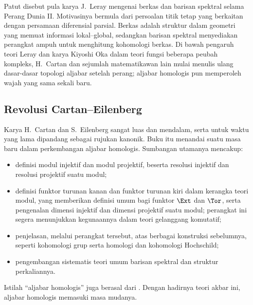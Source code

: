 Patut disebut pula karya J.\ Leray mengenai berkas dan barisan spektral
selama Perang Dunia II. Motivasinya bermula dari persoalan titik tetap
yang berkaitan dengan persamaan diferensial parsial. Berkas adalah
struktur dalam geometri yang memuat informasi lokal--global, sedangkan
barisan spektral menyediakan perangkat ampuh untuk menghitung kohomologi
berkas. Di bawah pengaruh teori Leray dan karya Kiyoshi Oka dalam teori
fungsi beberapa peubah kompleks, H.\ Cartan dan sejumlah matematikawan lain
mulai menulis ulang dasar-dasar topologi aljabar setelah perang; aljabar
homologis pun memperoleh wajah yang sama sekali baru.

\subsection*{Revolusi Cartan--Eilenberg}

Karya H.\ Cartan dan S.\ Eilenberg \cite{CE56} sangat luas dan mendalam,
serta untuk waktu yang lama dipandang sebagai rujukan kanonik. Buku itu
menandai suatu masa baru dalam perkembangan aljabar homologis. Sumbangan
utamanya mencakup:
\begin{itemize}
	\item definisi modul injektif dan modul projektif, beserta resolusi
	injektif dan resolusi projektif suatu modul;
	\item definisi funktor turunan kanan dan funktor turunan kiri dalam
	kerangka teori modul, yang memberikan definisi umum bagi funktor
	$\Ext$ dan $\Tor$, serta pengenalan dimensi injektif dan dimensi
	projektif suatu modul; perangkat ini segera menunjukkan kegunaannya
	dalam teori gelanggang komutatif;
	\item penjelasan, melalui perangkat tersebut, atas berbagai konstruksi
	sebelumnya, seperti kohomologi grup serta homologi dan kohomologi
	Hochschild;
	\item pengembangan sistematis teori umum barisan spektral dan struktur
	perkaliannya.
\end{itemize}

Istilah ``aljabar homologis'' juga berasal dari \cite{CE56}. Dengan
hadirnya teori akbar ini, aljabar homologis memasuki masa mudanya.

